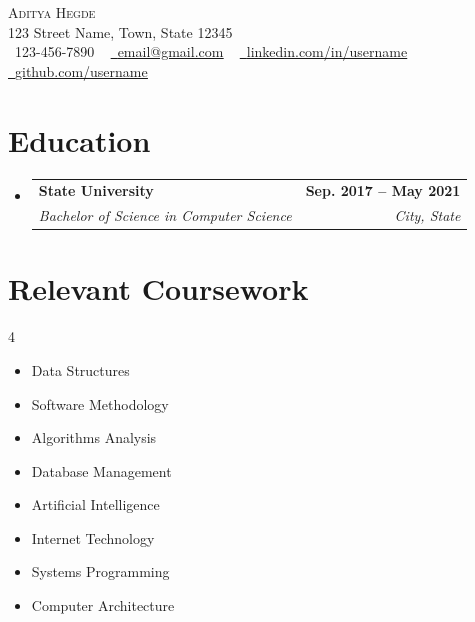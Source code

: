 \documentclass[letterpaper,11pt]{article}
\makeatletter
\newcommand{\resumeSubheading}[4]{
  \vspace{-2pt}\item
    \begin{tabular*}{1.0\textwidth}[t]{l@{\extracolsep{\fill}}r}
      \textbf{#1} & \textbf{\small #2} \\
      \textit{\small#3} & \textit{\small #4} \\
    \end{tabular*}\vspace{-7pt}
}
\newcommand{\resumeSubHeadingListStart}{\begin{itemize}[leftmargin=0.0in, label={}]}
\newcommand{\resumeSubHeadingListEnd}{\end{itemize}}
\makeatother
\begin{document}

\begin{center}
    {\Huge \scshape Aditya Hegde} \\ \vspace{1pt}
    123 Street Name, Town, State 12345 \\ \vspace{1pt}
    \small \raisebox{-0.1\height}\faPhone\ 123-456-7890 ~ \href{mailto:x@gmail.com}{\raisebox{-0.2\height}\faEnvelope\  \underline{email@gmail.com}} ~ 
    \href{https://linkedin.com/in//}{\raisebox{-0.2\height}\faLinkedin\ \underline{linkedin.com/in/username}}  ~
    \href{https://github.com/}{\raisebox{-0.2\height}\faGithub\ \underline{github.com/username}}
    \vspace{-8pt}
\end{center}


\section{Education}
  \resumeSubHeadingListStart
    \resumeSubheading
      {State University}{Sep. 2017 -- May 2021}
      {Bachelor of Science in Computer Science}{City, State}
  \resumeSubHeadingListEnd

\section{Relevant Coursework}
        \begin{multicols}{4}
            \begin{itemize}[itemsep=-5pt, parsep=3pt]
                \item\small Data Structures
                \item Software Methodology
                \item Algorithms Analysis
                \item Database Management
                \item Artificial Intelligence
                \item Internet Technology
                \item Systems Programming
                \item Computer Architecture
            \end{itemize}
        \end{multicols}
        \vspace*{2.0\multicolsep}
\end{document}
